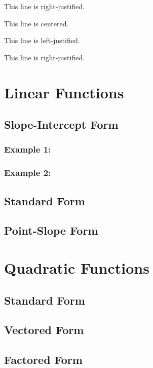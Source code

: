 \documentclass[11pt]{article}
\begin{document}
\begin{flushright} This line is right-justified. \end{flushright}

\vspace{1cm}

\Huge
\begin{center} This line is centered. \end{center}

\begin{flushleft} This line is left-justified. \end{flushleft}

\begin{flushright} This line is right-justified. \end{flushright}

\section{Linear Functions}
	\subsection{Slope-Intercept Form}
		\subsubsection{Example 1:}
		\subsubsection{Example 2:}
	\subsection{Standard Form}
	\subsection{Point-Slope Form}
\section{Quadratic Functions}
	\subsection{Standard Form}
	\subsection{Vectored Form}
	\subsection{Factored Form}
\end{document}
